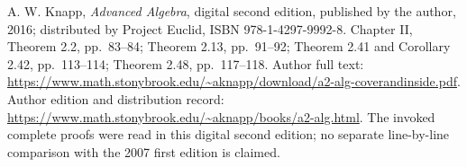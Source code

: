 A. W. Knapp,
\emph{Advanced Algebra}, digital second edition,
published by the author, 2016; distributed by Project Euclid,
ISBN 978-1-4297-9992-8.
Chapter II, Theorem 2.2, pp.~83--84; Theorem 2.13, pp.~91--92;
Theorem 2.41 and Corollary 2.42, pp.~113--114;
Theorem 2.48, pp.~117--118.
Author full text:
\url{https://www.math.stonybrook.edu/~aknapp/download/a2-alg-coverandinside.pdf}.
Author edition and distribution record:
\url{https://www.math.stonybrook.edu/~aknapp/books/a2-alg.html}.
The invoked complete proofs were read in this digital second edition;
no separate line-by-line comparison with the 2007 first edition is claimed.
